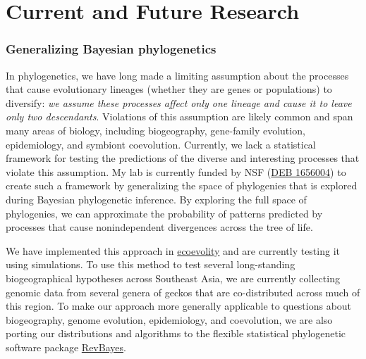 \section*{Current and Future Research}

\subsubsection*{Generalizing Bayesian phylogenetics}
In phylogenetics, we have long made a limiting assumption about the processes
that cause evolutionary lineages (whether they are genes or populations) to
diversify: \textit{we assume these processes affect only one lineage and cause
    it to leave only two descendants}.
Violations of this assumption are likely common and span many areas of biology,
including biogeography, gene-family evolution, epidemiology, and symbiont
coevolution.
Currently, we lack a statistical framework for testing the predictions of the
diverse and interesting processes that violate this assumption.
My lab is currently funded by NSF
(\href{https://www.nsf.gov/awardsearch/showAward?AWD_ID=1656004&HistoricalAwards=false}{DEB 1656004})
to create such a framework by generalizing the space of phylogenies that is
explored during Bayesian phylogenetic inference.
By exploring the full space of phylogenies, we can approximate the probability
of patterns predicted by processes that cause nonindependent divergences 
across the tree of life.

We have implemented this approach in 
\href{http://phyletica.org/ecoevolity/}{ecoevolity}
and are currently testing it using simulations.
To use this method to test several long-standing biogeographical
hypotheses across Southeast Asia,
we are currently collecting genomic data from several genera of geckos that are
co-distributed across much of this region.
To make our approach more generally applicable to questions about biogeography,
genome evolution, epidemiology, and coevolution,
we are also porting our distributions and algorithms to the flexible
statistical phylogenetic software package
\href{https://revbayes.github.io/}{RevBayes}.

